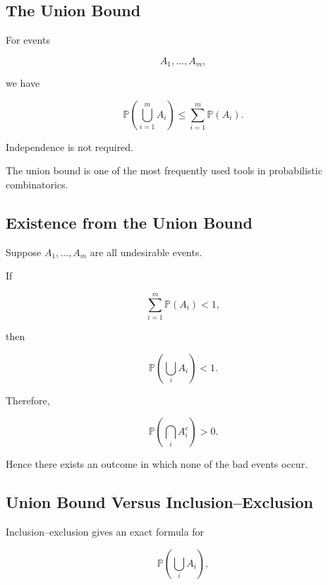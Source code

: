 \subsection{The Union Bound}
\label{subsec:union-bound}

\begin{theorem}
For events

\[
A_1,\ldots,A_m,
\]

we have

\[
\boxed{
\mathbb{P}
\left(
\bigcup_{i=1}^{m}A_i
\right)
\leq
\sum_{i=1}^{m}\mathbb{P}(A_i).
}
\]
\end{theorem}

Independence is not required.

The union bound is one of the most frequently used tools in
probabilistic combinatorics.

\subsection{Existence from the Union Bound}
\label{subsec:existence-union-bound}

Suppose \(A_1,\ldots,A_m\) are all undesirable events.

If

\[
\boxed{
\sum_{i=1}^{m}\mathbb{P}(A_i)<1,
}
\]

then

\[
\mathbb{P}
\left(
\bigcup_iA_i
\right)
<1.
\]

Therefore,

\[
\mathbb{P}
\left(
\bigcap_iA_i^c
\right)
>0.
\]

Hence there exists an outcome in which none of the bad events occur.

\subsection{Union Bound Versus Inclusion--Exclusion}
\label{subsec:union-bound-inclusion-exclusion}

Inclusion--exclusion gives an exact formula for

\[
\mathbb{P}\left(\bigcup_iA_i\right),
\]

